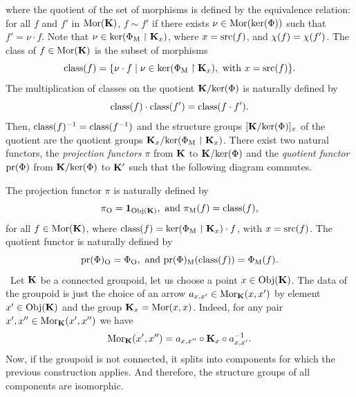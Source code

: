 \begin{article}
$$  $$%
  where the quotient of the set of morphisms is defined by the equivalence relation:
  for all  $f$ and $f'$ in ${\operatorname{Mor}}({\mathbf K})$, $f \sim f'$ if there exists $\nu \in {\operatorname{Mor}}(\mathrm{ker}(\Phi))$ such that $f' = \nu \cdot f$.
  Note that $\nu \in \mathrm{ker}(\Phi_{\mathrm{M}} \restriction {\mathbf K}_x)$,
  where $x = {\operatorname{src}}(f)$,
  and $\chi(f)=\chi(f')$.
  The class of $f \in {\operatorname{Mor}}({\mathbf K})$ is the subset of morphisms
  $$%
  \class(f) = \{ \nu \cdot f \mid \nu \in \ker(\Phi_\eM \restriction \KK_x), \text{ with } x = \source(f) \}.
  $$%
  The multiplication of classes on the quotient ${\mathbf K}/\mathrm{ker}(\Phi)$ is naturally defined by
  $$%
  \class(f) \cdot \class(f') = \class(f \cdot f').
  $$%
  Then, $\operatorname{class}(f)^{-1} = \operatorname{class}(f^{-1})$ and the structure groups $[{\mathbf K}/\mathrm{ker}(\Phi)]_x$ of the quotient are the quotient groups ${\mathbf K}_x/\mathrm{ker}(\Phi_{\mathrm{M}} \restriction {\mathbf K}_x)$.
  There exist two natural functors, the {\em projection functors} $\pi$ from ${\mathbf K}$ to ${\mathbf K}/\mathrm{ker}(\Phi)$ and the {\em quotient functor} $\mathrm{pr}(\Phi)$ from ${\mathbf K}/\mathrm{ker}(\Phi)$ to ${\mathbf K}'$ such that the following diagram commutes.
  \begin{center}
  \end{center}
  The projection functor $\pi$ is naturally defined by
  $$%
  \pi_\eO = \id_{\Obj(\KK)}, \text{ and } \pi_\eM(f) = \class(f),
  $$%
  for all $f \in {\operatorname{Mor}}({\mathbf K})$,
  where $\operatorname{class}(f) = \mathrm{ker}(\Phi_{\mathrm{M}} \restriction {\mathbf K}_x) \cdot f$,
  with $x = {\operatorname{src}}(f)$.
  The quotient functor is naturally defined by
  $$%
  \pr(\Phi)_\eO = \Phi_\eO, \text{ and } \pr(\Phi)_\eM(\class(f)) = \Phi_\eM(f).
  $$%
  \Note~Let ${\mathbf K}$ be a connected groupoid,
  let us choose a point $x \in {\operatorname{Obj}}({\mathbf K})$.
  The data of the groupoid is just the choice of an arrow $a_{x,x'} \in {\operatorname{Mor}}_{\mathbf K}(x,x')$ by element
  \linebreak
  $x' \in {\operatorname{Obj}}({\mathbf K})$ and the group ${\mathbf K}_x= {\operatorname{Mor}}(x,x)$.
  Indeed, for any pair $x',x'' \in {\operatorname{Mor}}_{\mathbf K}(x',x'')$ we have
  $$%
  \Mor_\KK(x',x'') = a_{x,x''} \circ \KK_x \circ a_{x,x'}^{-1}.
  $$%
  Now,
  if the groupoid is not connected,
  it splits into components for which the previous construction applies.
  And therefore,
  the structure groups of all components are isomorphic.
\end{article} %

